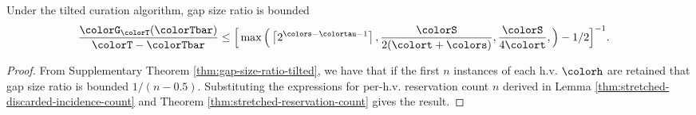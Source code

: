 \begin{theorem}
\label{thm:tilted-gap-size}
Under the tilted curation algorithm, gap size ratio is bounded
\begin{align*}
  \frac{\colorG_{\colorT}(\colorTbar)}{\colorT - \colorTbar}
  &\leq
  \Big[
    \max\Big(
      \left\lceil 2^{\colors - \colortau - 1} \right\rceil,
      \frac{\colorS}{2(\colort + \colors)},
      \frac{\colorS}{4\colort},
    \Big)
    - 1/2
  \Big]^{-1}.
\end{align*}
\end{theorem}
\begin{proof}

From Supplementary Theorem \ref{thm:gap-size-ratio-tilted}, we have that if the first $n$ instances of each h.v. $\colorh$ are retained that gap size ratio is bounded $1/(n - 0.5)$.
Substituting the expressions for per-h.v. reservation count $n$ derived in Lemma \ref{thm:stretched-discarded-incidence-count} and Theorem \ref{thm:stretched-reservation-count} gives the result.
\end{proof}
